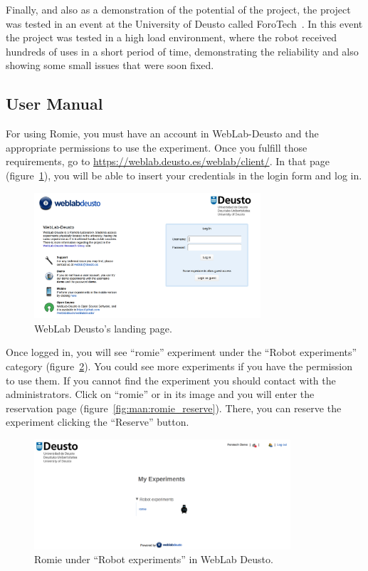 Finally, and also as a demonstration of the potential of the project, the project was tested in an
event at the University of Deusto called ForoTech~\cite{forotech}. In this event the project was
tested in a high load environment, where the robot received hundreds of uses in a short period of
time, demonstrating the reliability and also showing some small issues that were soon fixed.

\subsection{User Manual}

For using Romie, you must have an account in WebLab-Deusto and the appropriate permissions to use
the experiment. Once you fulfill those requirements, go to
\url{https://weblab.deusto.es/weblab/client/}. In that page (figure~\ref{fig:man:weblab}), you will
be able to insert your credentials in the login form and log in.

\begin{figure}[ht]
	\centering
	\includegraphics[width=0.75\textwidth]{fig/manuals/weblab}
	\caption{WebLab Deusto's landing page.}
	\label{fig:man:weblab}
\end{figure}

Once logged in, you will see ``romie'' experiment under the ``Robot experiments'' category
(figure~\ref{fig:man:romie_weblab}). You could see more experiments if you have the permission to
use them. If you cannot find the experiment you should contact with the administrators. Click on
``romie'' or in its image and you will enter the reservation page
(figure~\ref{fig:man:romie_reserve}). There, you can reserve the experiment clicking the ``Reserve''
button.

\begin{figure}[!htbp]
	\centering
	\includegraphics[width=0.85\textwidth]{fig/manuals/trivial/romie-weblab}
	\caption{Romie under ``Robot experiments'' in WebLab Deusto.}
	\label{fig:man:romie_weblab}
\end{figure}

